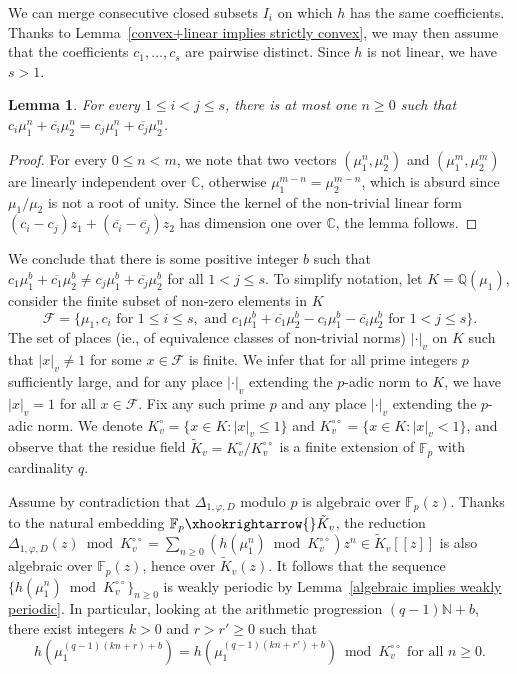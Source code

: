 \documentclass[11pt,a4paper]{article}
\theoremstyle{plain}
\newtheorem{lemma}[theorem]{Lemma}
\theoremstyle{remark}
\theoremstyle{custombold}
\begin{document}
We can merge consecutive closed subsets $I_i$ on which $h$ has the same coefficients. Thanks to Lemma~\ref{convex+linear implies strictly convex}, we may then assume that the coefficients $c_1,\ldots,c_s$ are pairwise distinct. Since $h$ is not linear, we have $s>1$.
\begin{lemma}
    For every $1\leq i< j\leq s$, there is at most one $n\geq0$ such that $c_i\mu_1^n+\overline{c_i}\mu_2^n=c_j\mu_1^n+\overline{c_j}\mu_2^n$.
\end{lemma}
\begin{proof}
  For every $0\leq n<m$, we note that two vectors $(\mu_1^n,\mu_2^n)$ and $(\mu_1^m,\mu_2^m)$ are linearly independent over $\mathbb C$, otherwise $\mu_1^{m-n}=\mu_2^{m-n}$, which is absurd since $\mu_1/\mu_2$ is not a root of unity. Since the kernel of the non-trivial linear form $(c_i-c_j)z_1+(\overline{c_i}-\overline{c_j})z_2$ has dimension one over $\mathbb C$, the lemma follows.
  \end{proof}
 We conclude that there is some positive integer $b$ such that $c_{1}\mu_1^b+\overline{c_{1}}\mu_2^b\neq c_{j}\mu_1^b+\overline{c_{j}}\mu_2^b$ for all $1<j\leq s$. To simplify notation, let $K=\mathbb Q(\mu_1)$, consider the finite subset of non-zero elements in $K$
 $$\mathcal{F}=\{\mu_1,c_i\text{ for }1\leq i\leq s,\text{ and }c_{1}\mu_1^b+\overline{c_{1}}\mu_2^b- c_{i}\mu_1^b-\overline{c_{i}}\mu_2^b\text{ for }1<j\leq s\}.$$
  The set of places (ie., of equivalence classes of non-trivial norms) $|\cdot|_v$ on $K$ such that $|x|_v\neq1$ for some $x\in\mathcal{F}$ is finite. We infer that for all prime integers $p$ sufficiently large, and for any place $|\cdot|_v$ extending the $p$-adic norm to $K$, we have $|x|_v=1$ for all $x\in\mathcal{F}$. Fix any such prime $p$ and any place $|\cdot|_v$ extending the $p$-adic norm. We denote $K_v^\circ=\{x\in K:|x|_v\leq1\}$ and $K_v^{\circ\circ}=\{x\in K:|x|_v<1\}$, and observe that the residue field $\tilde{K}_v=K_v^\circ/K_v^{\circ\circ}$ is a finite extension of $\mathbb F_p$ with cardinality $q$. 

Assume by contradiction that $\Delta_{1,\varphi,D}$ modulo $p$ is algebraic over $\mathbb F_p(z)$.  Thanks to the natural embedding $\mathbb F_p\xhookrightarrow{}\tilde{K}_v$, the reduction $\Delta_{1,\varphi,D}(z)\bmod K_v^{\circ\circ}=\sum_{n\geq0}(h(\mu_1^n)\bmod K_v^{\circ\circ})z^n\in\tilde{K}_v[[z]]$ is also algebraic over $\mathbb F_p(z)$, hence over $\tilde{K}_v(z)$. It follows that the sequence $\{h(\mu_1^n)\bmod K_v^{\circ\circ}\}_{n\geq0}$ is weakly periodic by Lemma~\ref{algebraic implies weakly periodic}. In particular, looking at the arithmetic progression $(q-1)\mathbb N+b$, there exist integers $k>0$ and $r>r'\geq0$ such that \begin{equation}\label{periodic condition}
    h(\mu_1^{(q-1)(kn+r)+b})= h(\mu_1^{(q-1)(kn+r')+b})\bmod K_v^{\circ\circ}\text{ for all }n\geq0.
\end{equation} 
\end{document}
